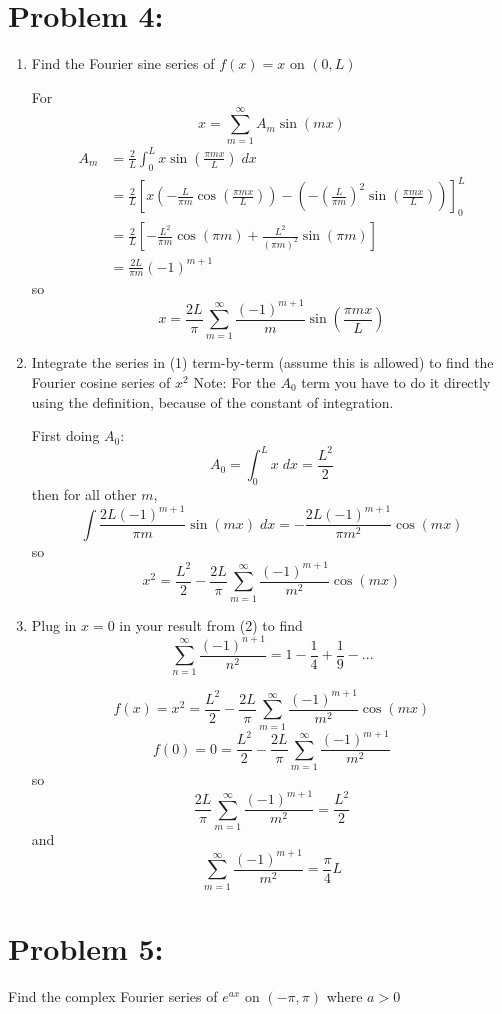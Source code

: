 \documentclass[12pt]{article}
\begin{document}
\section*{Problem 4:} 
\begin{enumerate}
    \item Find the Fourier sine series of $f(x) = x$ on $(0, L)$
    
    \color{blue}
    For 
    \[x = \sum_{m=1}^\infty A_m \sin(mx)\]
    \begin{align*}
        A_m &= \frac{2}{L}\int_0^L x \sin(\frac{\pi m x}{L})\; dx\\
        &= \frac{2}{L} \left[x \left(-\frac{L}{\pi m} \cos(\frac{\pi mx}{L})\right) - \left(-(\frac{L}{\pi m})^2 \sin(\frac{\pi mx}{L})\right)\right]_0^L\\
        &= \frac{2}{L}\left[-\frac{L^2}{\pi m } \cos(\pi m) + \frac{L^2}{(\pi m)^2}\sin(\pi m)\right]\\
        &= \frac{2L}{\pi m}(-1)^{m+1}
    \end{align*}
    so
    \[\boxed{x = \frac{2L}{\pi}\sum_{m=1}^\infty \frac{(-1)^{m+1}}{m}}\sin(\frac{\pi mx}{L})\]

    \color{black}
    \item Integrate the series in (1) term-by-term (assume this is allowed) to find the Fourier cosine series of $x^2$
    Note: For the $A_0$ term you have to do it directly using the definition, because of the constant of integration.

    \color{blue}
    First doing $A_0$:
    \[A_0 = \int_0^L x \; dx = \frac{L^2}{2}\] 
    then for all other $m$,
    \[\int \frac{2L(-1)^{m+1}}{\pi m}\sin(mx) \; dx = -\frac{2L(-1)^{m+1}}{\pi m^2}\cos(mx)\]
    so 
    \[\boxed{x^2 = \frac{L^2}{2} - \frac{2L}{\pi}\sum_{m=1}^\infty \frac{(-1)^{m+1}}{m^2}\cos(mx)}\]
    \color{black}
    \item Plug in $x = 0$ in your result from (2) to find
    \[\sum_{n=1}^\infty \frac{(-1)^{n+1}}{n^2} = 1 - \frac{1}{4} + \frac{1}{9} - ...\]

    \color{blue}
    \[f(x) = x^2 = \frac{L^2}{2} - \frac{2L}{\pi}\sum_{m=1}^\infty \frac{(-1)^{m+1}}{m^2}\cos(mx)\] 
    \[f(0) = 0 = \frac{L^2}{2} - \frac{2L}{\pi}\sum_{m=1}^\infty \frac{(-1)^{m+1}}{m^2}\]
    so 
    \[\frac{2L}{\pi}\sum_{m=1}^\infty \frac{(-1)^{m+1}}{m^2} = \frac{L^2}{2}\]
    and 
    \[\boxed{\sum_{m=1}^\infty \frac{(-1)^{m+1}}{m^2} = \frac{\pi}{4}L}\]
\end{enumerate}

\pagebreak
\section*{Problem 5:}
Find the complex Fourier series of $e^{ax}$ on $(-\pi, \pi)$ where $a > 0$ 
\end{document}
